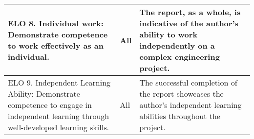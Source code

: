 \begin{table}[h]
\begin{tabular}{|p{8.5cm}|p{1cm}|p{6.5cm}|}
\hline
ELO 8. Individual work: Demonstrate competence to work effectively as an individual. & All & The report, as a whole, is indicative of the author's ability to work independently on a complex engineering project. \\
\hline
ELO 9. Independent Learning Ability: Demonstrate competence to engage in independent learning through well-developed learning skills. & All & The successful completion of the report showcases the author's independent learning abilities throughout the project. \\
\hline
\end{tabular}
\end{table}

